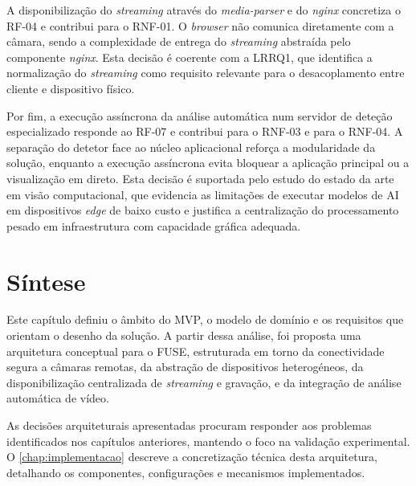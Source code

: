A disponibilização do \textit{streaming} através do \textit{media-parser} e do \textit{nginx} concretiza o RF-04 e contribui para o RNF-01. O \textit{browser} não comunica diretamente com a câmara, sendo a complexidade de entrega do \textit{streaming} abstraída pelo componente \textit{nginx}. Esta decisão é coerente com a LRRQ1, que identifica a normalização do \textit{streaming} como requisito relevante para o desacoplamento entre cliente e dispositivo físico.

Por fim, a execução assíncrona da análise automática num servidor de deteção especializado responde ao RF-07 e contribui para o RNF-03 e para o RNF-04. A separação do detetor face ao núcleo aplicacional reforça a modularidade da solução, enquanto a execução assíncrona evita bloquear a aplicação principal ou a visualização em direto. Esta decisão é suportada pelo estudo do estado da arte em visão computacional, que evidencia as limitações de executar modelos de \gls{AI} em dispositivos \textit{edge} de baixo custo e justifica a centralização do processamento pesado em infraestrutura com capacidade gráfica adequada.


\section{Síntese}

Este capítulo definiu o âmbito do \gls{MVP}, o modelo de domínio e os requisitos que orientam o desenho da solução. A partir dessa análise, foi proposta uma arquitetura conceptual para o \gls{FUSE}, estruturada em torno da conectividade segura a câmaras remotas, da abstração de dispositivos heterogéneos, da disponibilização centralizada de \textit{streaming} e gravação, e da integração de análise automática de vídeo.

As decisões arquiteturais apresentadas procuram responder aos problemas identificados nos capítulos anteriores, mantendo o foco na validação experimental. O \autoref{chap:implementacao} descreve a concretização técnica desta arquitetura, detalhando os componentes, configurações e mecanismos implementados.
